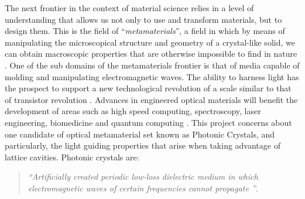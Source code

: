 The next frontier in the context of material science\remove[SEC]{,} relies in a level of understanding that allows us not only to use and transform materials, but to design them. This is the field of ``\textit{metamaterials}'', a field in which by means of manipulating the microscopical structure and geometry of a crystal-like solid, we can obtain macroscopic properties that are otherwise impossible to find in nature \cite{Engheta2006, Capoliono2009}. One of the sub domains of the metamaterials frontier is that of media capable of molding and manipulating electromagnetic waves. The ability to harness light has the prospect to support a new technological revolution of a scale similar to that of transistor revolution \cite{Joannopoulos2008}.
Advances in engineered optical materials will benefit the development of areas such as high speed computing, spectroscopy, laser engineering, biomedicine and quantum computing \cite{Obayya2011}. 
This project concerns about one candidate of optical metamaterial set known as Photonic Crystals, and particularly, the light guiding properties that arise when taking advantage of lattice cavities.
Photonic crystals are: 

\begin{quote}
\textit{``Artificially created periodic low-loss dielectric medium in which electromagnetic waves of certain frequencies cannot propagate ''}\cite{GangBao1987}.  
\end{quote} 

